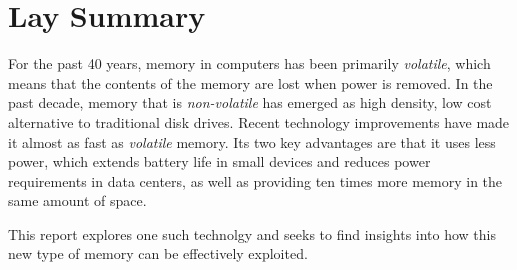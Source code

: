

\chapter{Lay Summary}

For the past 40 years, memory in computers has been primarily \textit{volatile}, which 
means that the contents of the memory are lost when power is removed.  In the past
decade, memory that is \textit{non-volatile} has emerged as high density, low cost
alternative to traditional disk drives.  Recent technology improvements have made it
almost as fast as \textit{volatile} memory.  Its two key advantages are that it uses
less power, which extends battery life in small devices and reduces power requirements
in data centers, as well as providing ten times more memory in the same amount of
space.

This report explores one such technolgy and seeks to find insights into how this new
type of memory can be effectively exploited.

